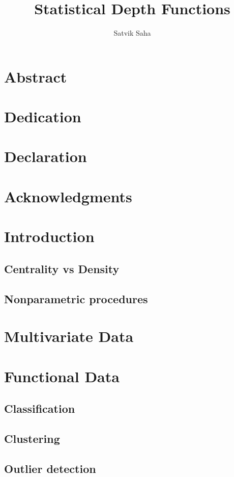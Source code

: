\documentclass[12pt]{report}
\title{Statistical Depth Functions}
\author{Satvik Saha}
\date{}
\begin{document}
    


    \chapter*{Abstract}


    \chapter*{Dedication}


    \chapter*{Declaration}


    \chapter*{Acknowledgments}


    \tableofcontents


    \chapter{Introduction}
    

    \section{Centrality vs Density}
    \section{Nonparametric procedures}


    \chapter{Multivariate Data}
    


    \chapter{Functional Data}
        \section{Classification}
        \section{Clustering}
        \section{Outlier detection}
\end{document}
